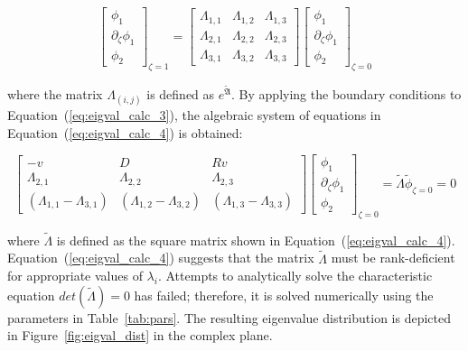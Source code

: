 \begin{equation} \label{eq:eigval_calc_3}
    \begin{bmatrix}
        \phi_1 \\ \partial_\zeta \phi_1 \\ \phi_2
    \end{bmatrix}_{\zeta=1} = \begin{bmatrix}
        \Lambda_{1,1} & \Lambda_{1,2} & \Lambda_{1,3} \\
        \Lambda_{2,1} & \Lambda_{2,2} & \Lambda_{2,3} \\
        \Lambda_{3,1} & \Lambda_{3,2} & \Lambda_{3,3}
    \end{bmatrix} \begin{bmatrix}
        \phi_1 \\ \partial_\zeta \phi_1 \\ \phi_2
    \end{bmatrix}_{\zeta=0}
\end{equation}

where the matrix $\Lambda_{(i,j)}$ is defined as $e^{\tilde{\mathfrak{A}}}$. By applying the boundary conditions to Equation~(\ref{eq:eigval_calc_3}), the algebraic system of equations in Equation~(\ref{eq:eigval_calc_4}) is obtained:

\begin{equation} \label{eq:eigval_calc_4}
    \begin{bmatrix}
        -v & D & Rv \\
        \Lambda_{2,1} & \Lambda_{2,2} & \Lambda_{2,3} \\
        (\Lambda_{1,1} - \Lambda_{3,1}) & (\Lambda_{1,2} - \Lambda_{3,2}) & (\Lambda_{1,3} - \Lambda_{3,3})
    \end{bmatrix} \begin{bmatrix}
        \phi_1 \\ \partial_\zeta \phi_1 \\ \phi_2
    \end{bmatrix}_{\zeta=0} = \tilde{\Lambda} \tilde{\phi}_{\zeta = 0} = 0
\end{equation}

where $\tilde{\Lambda}$ is defined as the square matrix shown in Equation~(\ref{eq:eigval_calc_4}). Equation~(\ref{eq:eigval_calc_4}) suggests that the matrix $\tilde{\Lambda}$ must be rank-deficient for appropriate values of $\lambda_i$. Attempts to analytically solve the characteristic equation $det(\tilde{\Lambda}) = 0$ has failed; therefore, it is solved numerically using the parameters in Table~\ref{tab:pars}. The resulting eigenvalue distribution is depicted in Figure~\ref{fig:eigval_dist} in the complex plane.

